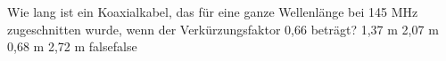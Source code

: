    {Wie lang ist ein Koaxialkabel, das für eine ganze Wellenlänge bei 145 MHz zugeschnitten wurde, wenn der Verkürzungsfaktor 0,66 beträgt?}
    {1,37 m}
    {2,07 m}
    {0,68 m}
    {2,72 m}
    {false}{false}